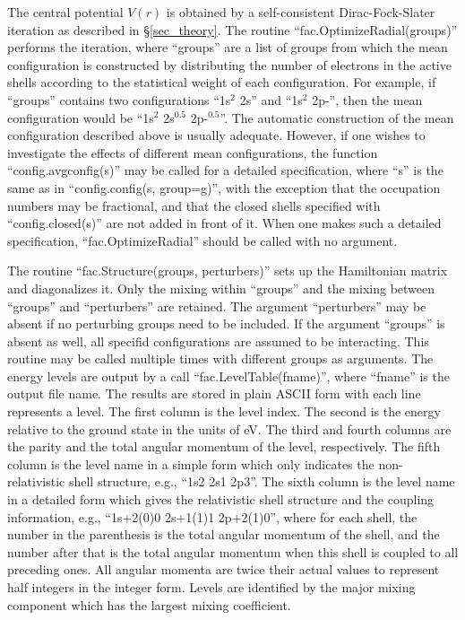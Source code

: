 \documentclass{elsart}
\begin{document}
The central potential $V(r)$ is obtained by a self-consistent Dirac-Fock-Slater
iteration as described in \S\ref{sec_theory}. The routine
``fac.OptimizeRadial(groups)'' performs the iteration, where ``groups'' are a
list of 
groups from which the mean configuration is constructed by distributing the
number of electrons in the active shells according to the statistical weight
of each configuration. For example, if ``groups''
contains two configurations ``1s$^2$ 2s'' and ``1s$^2$ 2p-'', then the mean
configuration would be ``1s$^2$ 2s$^{0.5}$ 2p-$^{0.5}$''. The automatic
construction of the mean configuration described above is usually
adequate. However, if one wishes to investigate the effects of different mean
configurations, the function ``config.avgconfig(s)'' may be called for a
detailed specification, where ``s'' is the same as in ``config.config(s,
group=g)'', with the exception that the occupation numbers may be fractional,
and that the closed shells specified with ``config.closed(s)'' are not added
in front of it. When one makes such a detailed specification,
``fac.OptimizeRadial'' should be called with no argument. 

The routine ``fac.Structure(groups, perturbers)'' sets up the Hamiltonian
matrix and diagonalizes it. Only the mixing within ``groups'' and the mixing
between ``groups'' and ``perturbers'' are retained. The argument
``perturbers'' may be absent if no perturbing groups need to be included. If
the argument ``groups'' is absent as well, all specifid configurations are
assumed to be interacting. This routine may be called 
multiple times with different groups as arguments. The energy levels are
output by a call ``fac.LevelTable(fname)'', where ``fname'' is the output file
name. The results are stored in plain ASCII 
form with each line represents a level. The first column is the level index.
The second is the energy relative to the ground state in the units of eV. The
third and fourth columns are the parity and the total angular momentum of the
level, respectively. The fifth column is the 
level name in a simple form which only indicates the non-relativistic shell
structure, e.g., ``1s2 2s1 2p3''. The sixth column is the level name in a
detailed form which gives the relativistic shell structure and the coupling
information, e.g., ``1s+2(0)0 2s+1(1)1 2p+2(1)0'', where for each shell, the
number in the parenthesis is the total angular momentum of the shell, and the
number after that is the total angular momentum when this shell is coupled to
all preceding ones. All angular momenta are twice their actual values to
represent half integers in the integer form. Levels are identified by the major
mixing component which has the largest mixing coefficient. 
\end{document}

